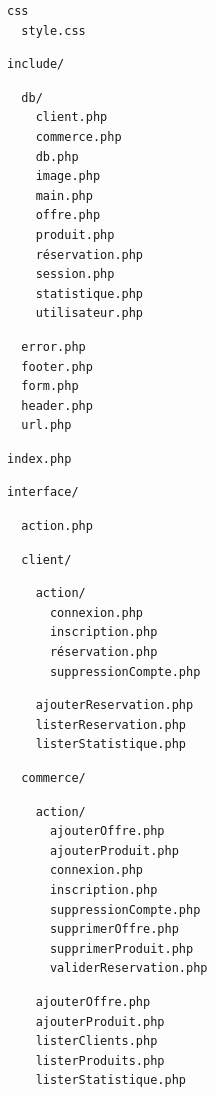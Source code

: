 \documentclass{beamer}
\begin{document}
\begin{frame}[fragile]
	\begin{multicols}{3}
		\tiny{
\color{blue}
		\begin{Verbatim}
css
  style.css
		\end{Verbatim}
\color{blue}
		\begin{Verbatim}
include/
		\end{Verbatim}
\color{violet}
		\begin{Verbatim}
  db/
    client.php
    commerce.php
    db.php
    image.php
    main.php
    offre.php
    produit.php
    réservation.php
    session.php
    statistique.php
    utilisateur.php
		\end{Verbatim}
\color{blue}
		\begin{Verbatim}
  error.php
  footer.php
  form.php
  header.php
  url.php
		\end{Verbatim}
\color{red}
		\begin{Verbatim}
index.php
		\end{Verbatim}
\color{black}
		\begin{Verbatim}
interface/
		\end{Verbatim}
\color{red}
		\begin{Verbatim}
  action.php
		\end{Verbatim}
\color{blue}
		\begin{Verbatim}
  client/
		\end{Verbatim}
\color{forestgreen}
		\begin{Verbatim}
    action/
      connexion.php
      inscription.php
      réservation.php
      suppressionCompte.php
    		\end{Verbatim}
\color{frenchblue}
		\begin{Verbatim}
    ajouterReservation.php
    listerReservation.php
    listerStatistique.php
		\end{Verbatim}
\color{blue}
		\begin{Verbatim}
  commerce/
		\end{Verbatim}
\color{forestgreen}
		\begin{Verbatim}
    action/
      ajouterOffre.php
      ajouterProduit.php
      connexion.php
      inscription.php
      suppressionCompte.php
      supprimerOffre.php
      supprimerProduit.php
      validerReservation.php
    		\end{Verbatim}
\color{frenchblue}
		\begin{Verbatim}
    ajouterOffre.php
    ajouterProduit.php
    listerClients.php
    listerProduits.php
    listerStatistique.php

\end{Verbatim}}
\end{multicols}
\end{frame}
\end{document}
